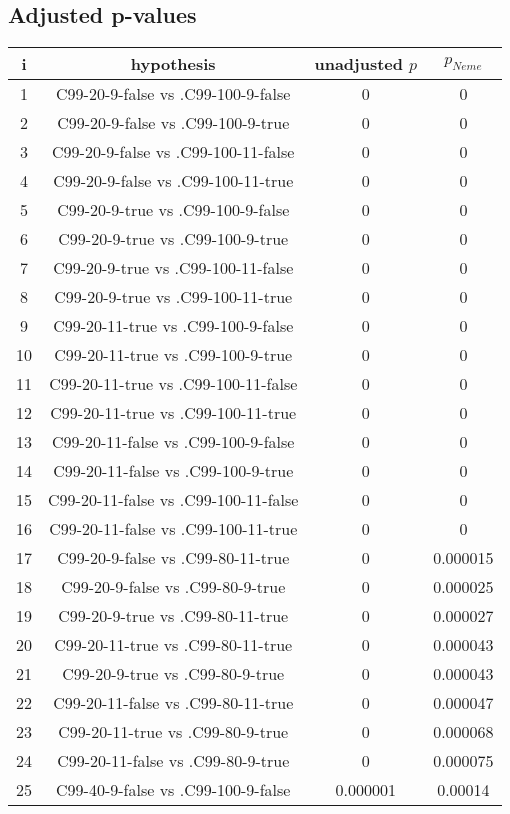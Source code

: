 \documentclass[a4paper,10pt]{article}
\begin{document}
\begin{landscape}
\pagebreak

\subsection{Adjusted p-values}

\begin{table}[!htp]
\centering\scriptsize
\begin{tabular}{cccc}
i&hypothesis&unadjusted $p$&$p_{Neme}$\\
\hline1&C99-20-9-false vs .C99-100-9-false&0&0\\
2&C99-20-9-false vs .C99-100-9-true&0&0\\
3&C99-20-9-false vs .C99-100-11-false&0&0\\
4&C99-20-9-false vs .C99-100-11-true&0&0\\
5&C99-20-9-true vs .C99-100-9-false&0&0\\
6&C99-20-9-true vs .C99-100-9-true&0&0\\
7&C99-20-9-true vs .C99-100-11-false&0&0\\
8&C99-20-9-true vs .C99-100-11-true&0&0\\
9&C99-20-11-true vs .C99-100-9-false&0&0\\
10&C99-20-11-true vs .C99-100-9-true&0&0\\
11&C99-20-11-true vs .C99-100-11-false&0&0\\
12&C99-20-11-true vs .C99-100-11-true&0&0\\
13&C99-20-11-false vs .C99-100-9-false&0&0\\
14&C99-20-11-false vs .C99-100-9-true&0&0\\
15&C99-20-11-false vs .C99-100-11-false&0&0\\
16&C99-20-11-false vs .C99-100-11-true&0&0\\
17&C99-20-9-false vs .C99-80-11-true&0&0.000015\\
18&C99-20-9-false vs .C99-80-9-true&0&0.000025\\
19&C99-20-9-true vs .C99-80-11-true&0&0.000027\\
20&C99-20-11-true vs .C99-80-11-true&0&0.000043\\
21&C99-20-9-true vs .C99-80-9-true&0&0.000043\\
22&C99-20-11-false vs .C99-80-11-true&0&0.000047\\
23&C99-20-11-true vs .C99-80-9-true&0&0.000068\\
24&C99-20-11-false vs .C99-80-9-true&0&0.000075\\
25&C99-40-9-false vs .C99-100-9-false&0.000001&0.00014\\

\end{tabular}
\end{table}
\end{landscape}
\end{document}
